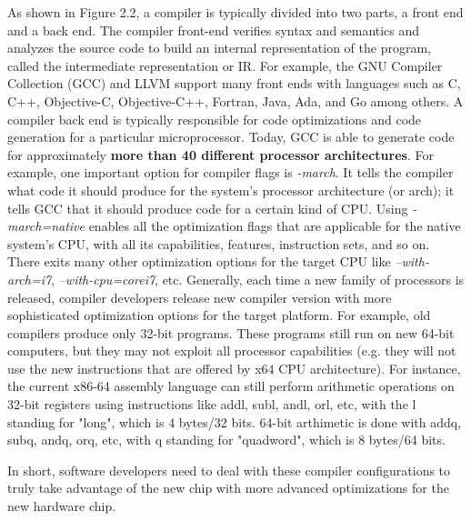 As shown in Figure 2.2, a compiler is typically divided into two parts, a front end and a back end. The compiler front-end verifies syntax and semantics and analyzes the source code to build an internal representation of the program, called the intermediate representation or IR. For example, the GNU Compiler Collection (GCC) and LLVM support many front ends with languages such as C, C++, Objective-C, Objective-C++, Fortran, Java, Ada, and Go among others. 
A compiler back end is typically responsible for code optimizations and code generation for a particular microprocessor. Today, GCC is able to generate code for approximately \textbf{more than 40 different processor architectures}.
For example, one important option for compiler flags is \textit{-march}. It tells the compiler what code it should produce for the system's processor architecture (or arch); it tells GCC that it should produce code for a certain kind of CPU. Using \textit{-march=native} enables all the optimization flags that are applicable for the native system's CPU, with all its capabilities, features, instruction sets, and so on. There exits many other optimization options for the target CPU like \textit{--with-arch=i7}, \textit{--with-cpu=corei7}, etc.
Generally, each time a new family of processors is released, compiler developers release new compiler version with more sophisticated optimization options for the target platform. For example, old compilers produce only 32-bit programs. These programs still run on new 64-bit computers, but they may not exploit all processor capabilities (e.g. they will not use the new instructions that are offered by x64 CPU architecture). For instance, the current x86-64 assembly language can still perform arithmetic operations on 32-bit registers using instructions like addl, subl, andl, orl, etc, with the l standing for "long", which is 4 bytes/32 bits. 64-bit arthimetic is done with addq, subq, andq, orq, etc, with q standing for "quadword", which is 8 bytes/64 bits.

In short, software developers need to deal with these compiler configurations to truly take advantage of the new chip with more advanced optimizations for the new hardware chip.







